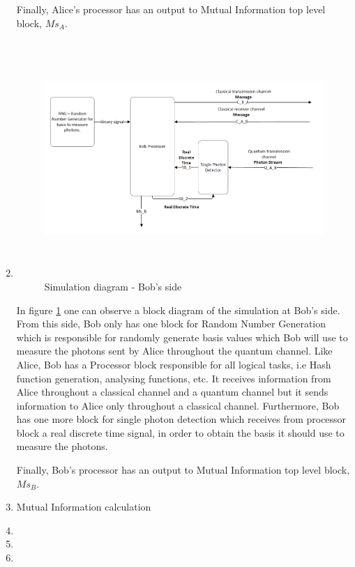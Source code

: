 \begin{enumerate}
    Finally, Alice's processor has an output to Mutual Information top level block, $Ms_{A}$.

  \item

  \begin{figure}[h]
	\centering
	\includegraphics[width=1.1\textwidth, height=9cm]{./sdf/ot_with_discrete_variables/figures/Simulation_Bob.png}
	\caption{Simulation diagram - Bob's side}\label{simulationbob}
\end{figure}

    In figure \ref{simulationbob} one can observe a block diagram of the simulation at Bob's side. From this side, Bob only has one block for Random Number Generation which is responsible for randomly generate basis values which Bob will use to measure the photons sent by Alice throughout the quantum channel. Like Alice, Bob has a Processor block responsible for all logical tasks, i.e Hash function generation, analysing functions, etc. It receives information from Alice throughout a classical channel and a quantum channel but it sends information to Alice only throughout a classical channel. Furthermore, Bob has one more block for single photon detection which receives from processor block a real discrete time signal, in order to obtain the basis it should use to measure the photons.

    Finally, Bob's processor has an output to Mutual Information top level block, $Ms_{B}$.

  \item Mutual Information calculation
  \item
  \item
  \item
\end{enumerate}





